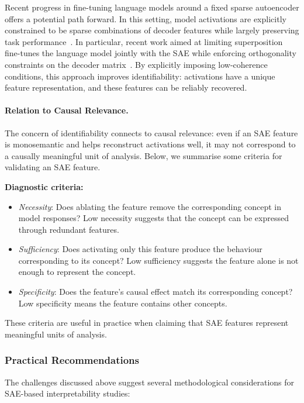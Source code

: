 Recent progress in fine-tuning language models around a fixed sparse autoencoder offers a potential path forward. In this setting, model activations are explicitly constrained to be sparse combinations of decoder features while largely preserving task performance~. In particular, recent work aimed at limiting superposition fine-tunes the language model jointly with the SAE while enforcing orthogonality constraints on the decoder matrix~. By explicitly imposing low-coherence conditions, this approach improves identifiability: activations have a unique feature representation, and these features can be reliably recovered.

\paragraph{Relation to Causal Relevance.}
The concern of identifiability connects to causal relevance: even if an SAE feature is monosemantic and helps reconstruct activations well, it may not correspond to a causally meaningful unit of analysis. Below, we summarise some criteria for validating an SAE feature.

\textbf{Diagnostic criteria:}
\begin{itemize}
    \item \textit{Necessity}: Does ablating the feature remove the corresponding concept in model responses? Low necessity suggests that the concept can be expressed through redundant features.
    \item \textit{Sufficiency}: Does activating only this feature produce the behaviour corresponding to its concept? Low sufficiency suggests the feature alone is not enough to represent the concept.
    \item \textit{Specificity}: Does the feature's causal effect match its corresponding concept? Low specificity means the feature contains other concepts.
\end{itemize}

These criteria are useful in practice when claiming that SAE features represent meaningful units of analysis.


\subsubsection{Practical Recommendations}
The challenges discussed above suggest several methodological considerations for SAE-based interpretability studies:

